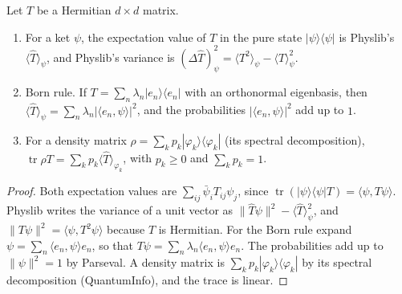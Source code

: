 \begin{theorem}\label{thm:qinfo-bridge}
  \leanok
  Let $T$ be a Hermitian $d\times d$ matrix.
  \begin{enumerate}
    \item For a ket $\psi$, the expectation value of $T$ in the pure state $|\psi\rangle\langle\psi|$ is Physlib's
      $\langle\hat T\rangle_\psi$, and Physlib's variance is $(\Delta\hat T)^2_\psi=\langle T^2\rangle_\psi-\langle T\rangle_\psi^2$.
    \item Born rule. If $T=\sum_n\lambda_n|e_n\rangle\langle e_n|$ with an orthonormal eigenbasis, then
      $\langle\hat T\rangle_\psi=\sum_n\lambda_n|\langle e_n,\psi\rangle|^2$, and the probabilities $|\langle e_n,\psi\rangle|^2$
      add up to $1$.
    \item For a density matrix $\rho=\sum_kp_k|\varphi_k\rangle\langle\varphi_k|$ (its spectral decomposition),
      $\operatorname{tr}\rho T=\sum_kp_k\langle\hat T\rangle_{\varphi_k}$, with $p_k\ge0$ and $\sum_kp_k=1$.
  \end{enumerate}
\end{theorem}
\begin{proof}\leanok
  Both expectation values are $\sum_{ij}\bar\psi_iT_{ij}\psi_j$, since
  $\operatorname{tr}(|\psi\rangle\langle\psi|T)=\langle\psi,T\psi\rangle$. Physlib writes the variance of a unit vector as
  $\|\hat T\psi\|^2-\langle\hat T\rangle_\psi^2$, and $\|T\psi\|^2=\langle\psi,T^2\psi\rangle$ because $T$ is Hermitian. For the
  Born rule expand $\psi=\sum_n\langle e_n,\psi\rangle e_n$, so that $T\psi=\sum_n\lambda_n\langle e_n,\psi\rangle e_n$. The
  probabilities add up to $\|\psi\|^2=1$ by Parseval. A density matrix is $\sum_kp_k|\varphi_k\rangle\langle\varphi_k|$ by its
  spectral decomposition (QuantumInfo), and the trace is linear.
\end{proof}

